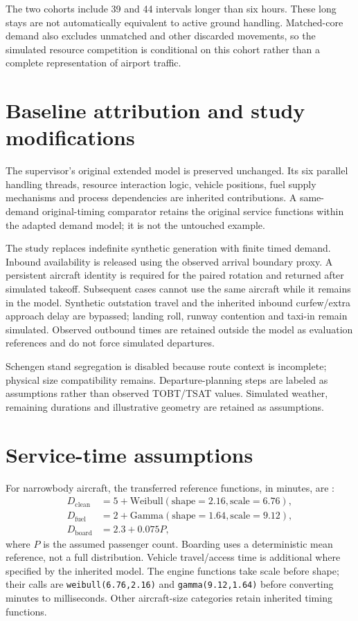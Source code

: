 The two cohorts include 39 and 44 intervals longer than six hours. These long stays are not automatically equivalent to active ground handling. Matched-core demand also excludes unmatched and other discarded movements, so the simulated resource competition is conditional on this cohort rather than a complete representation of airport traffic.

\section{Baseline attribution and study modifications}
The supervisor's original extended model is preserved unchanged. Its six parallel handling threads, resource interaction logic, vehicle positions, fuel supply mechanisms and process dependencies are inherited contributions. A same-demand original-timing comparator retains the original service functions within the adapted demand model; it is not the untouched example.

The study replaces indefinite synthetic generation with finite timed demand. Inbound availability is released using the observed arrival boundary proxy. A persistent aircraft identity is required for the paired rotation and returned after simulated takeoff. Subsequent cases cannot use the same aircraft while it remains in the model. Synthetic outstation travel and the inherited inbound curfew/extra approach delay are bypassed; landing roll, runway contention and taxi-in remain simulated. Observed outbound times are retained outside the model as evaluation references and do not force simulated departures.

Schengen stand segregation is disabled because route context is incomplete; physical size compatibility remains. Departure-planning steps are labeled as assumptions rather than observed TOBT/TSAT values. Simulated weather, remaining durations and illustrative geometry are retained as assumptions.

\section{Service-time assumptions}
For narrowbody aircraft, the transferred reference functions, in minutes, are \cite{schultz2012dynamic}:
\begin{align}
D_{\mathrm{clean}} &=5+\mathrm{Weibull}(\mathrm{shape}=2.16,\mathrm{scale}=6.76),\\
D_{\mathrm{fuel}} &=2+\mathrm{Gamma}(\mathrm{shape}=1.64,\mathrm{scale}=9.12),\\
D_{\mathrm{board}} &=2.3+0.075P,
\end{align}
where $P$ is the assumed passenger count. Boarding uses a deterministic mean reference, not a full distribution. Vehicle travel/access time is additional where specified by the inherited model. The engine functions take scale before shape; their calls are \texttt{weibull(6.76,2.16)} and \texttt{gamma(9.12,1.64)} before converting minutes to milliseconds. Other aircraft-size categories retain inherited timing functions.

